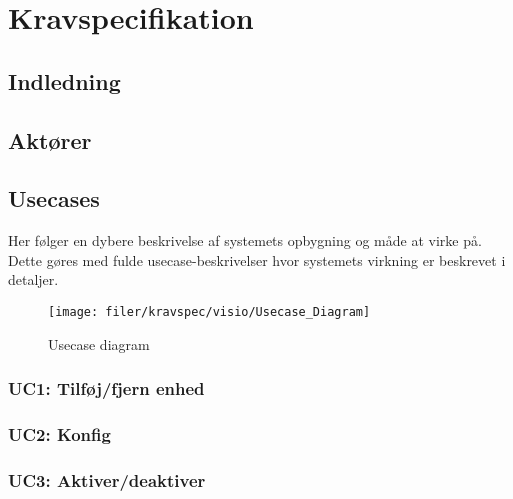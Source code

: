\chapter{Kravspecifikation}

\section{Indledning}


\newpage
\section{Aktører}


\newpage
\section{Usecases}\label{header:usecases}

Her følger en dybere beskrivelse af systemets opbygning og måde at virke på. Dette gøres med fulde usecase-beskrivelser hvor systemets virkning er beskrevet i detaljer.

\begin{figure}[H] \centering
\vspace*{\fill}
\texttt{[image: filer/kravspec/visio/Usecase\_Diagram]}
\caption{Usecase diagram}
\label{lab:usecasediagram}
\vspace*{\fill}
\end{figure}


\newpage

\subsection{UC1: Tilføj/fjern enhed}



\subsection{UC2: Konfig}



\subsection{UC3: Aktiver/deaktiver}


